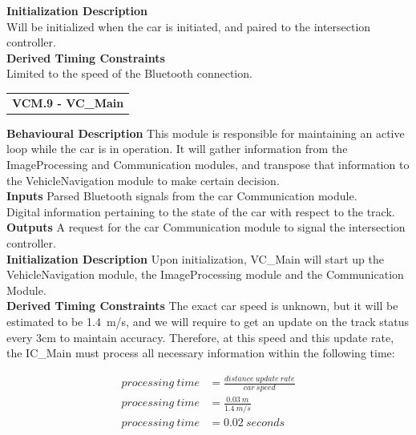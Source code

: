 \documentclass [10pt]{article}
\newcommand{\carSpeed}{1.4\ m/s}
\begin{document}
\textbf{Initialization Description} \\
 Will be initialized when the car is initiated, and paired to the intersection controller.\\

\textbf{Derived Timing Constraints} \\
Limited to the speed of the Bluetooth connection.  \\




\begin{longtable}{p{}}
\rowcolor{tableCell}\textbf{VCM.9 - VC\_Main} \\
\end{longtable}

\textbf{Behavioural Description} 
This module is responsible for maintaining an active loop while the car is in operation. It will gather information from the ImageProcessing and Communication modules, and transpose that information to the VehicleNavigation module to make certain decision. \\


\textbf{Inputs}
Parsed Bluetooth signals from the car Communication module. \\
Digital information pertaining to the state of the car with respect to the track. \\

\textbf{Outputs}
A request for the car Communication module to signal the intersection controller. \\

\textbf{Initialization Description}
Upon initialization, VC\_Main will start up the VehicleNavigation module, the ImageProcessing module and the Communication Module. \\

\textbf{Derived Timing Constraints} 
The exact car speed is unknown, but it will be estimated to be \carSpeed, and we will require to get an update on the track status every 3cm to maintain accuracy. Therefore, at this speed and this update rate, the IC\_Main must process all necessary information within the following time:

  
    \begin{align*}
     processing\ time & = \frac{distance\ update\ rate}{car\ speed} \\
     processing\ time & = \frac{0.03\ m}{\carSpeed} \\
     processing\ time & = 0.02\ seconds\\
    \end{align*}
\end{document}
